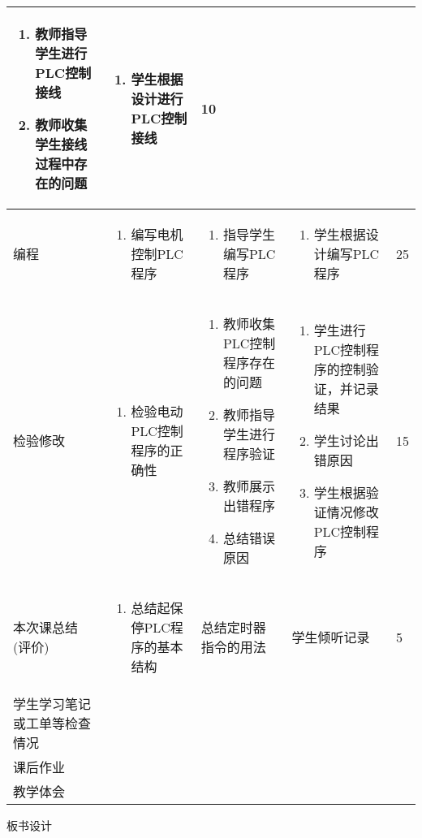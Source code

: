 {\begin{landscape}
\begin{longtable}{|m{10mm}|m{50mm}|m{50mm}|m{50mm}|m{15mm}|}
\begin{enumerate}
\item 教师指导学生进行PLC控制接线
\item 教师收集学生接线过程中存在的问题
\end{enumerate} &\begin{enumerate}
\item 学生根据设计进行PLC控制接线
\end{enumerate} &10 \\\hline
编程&
\begin{enumerate}
\item 编写电机控制PLC程序
\end{enumerate} &\begin{enumerate}
\item 指导学生编写PLC程序
\end{enumerate} &\begin{enumerate}
\item 学生根据设计编写PLC程序
\end{enumerate} &25 \\\hline
\centering 检验修改&\begin{enumerate}
\item 检验电动PLC控制程序的正确性
\end{enumerate}&\begin{enumerate}
\item 教师收集PLC控制程序存在的问题
\item 教师指导学生进行程序验证
\item 教师展示出错程序
\item 总结错误原因
\end{enumerate}&\begin{enumerate}
\item 学生进行PLC控制程序的控制验证，并记录结果
\item 学生讨论出错原因
\item 学生根据验证情况修改PLC控制程序
\end{enumerate}&15 \\\hline
\centering 本次课总结(评价)&\begin{enumerate}
\item 总结起保停PLC程序的基本结构 
\end{enumerate}&总结定时器指令的用法  &学生倾听记录 &5 \\\hline
\centering 学生学习笔记或工单等检查情况&\multicolumn{4}{m{165mm}|}{\quad}\\\hline
\centering 课后作业&\multicolumn{4}{m{165mm}|}{}\\\hline
\centering 教学体会&\multicolumn{4}{m{165mm}|}{\quad}\\
\end{longtable}

\end{landscape}
\clearpage

\begin{center}
{\huge 板书设计}
\end{center}
}

